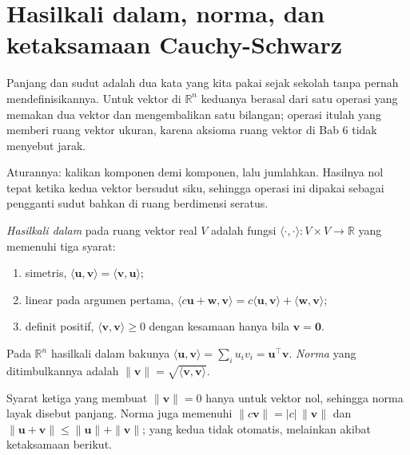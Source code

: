 \section{Hasilkali dalam, norma, dan ketaksamaan Cauchy-Schwarz}

Panjang dan sudut adalah dua kata yang kita pakai sejak sekolah tanpa pernah
mendefinisikannya. Untuk vektor di $\mathbb{R}^{n}$ keduanya berasal dari satu operasi
yang memakan dua vektor dan mengembalikan satu bilangan; operasi itulah yang memberi
ruang vektor ukuran, karena aksioma ruang vektor di Bab 6 tidak menyebut jarak.

Aturannya: kalikan komponen demi komponen, lalu jumlahkan. Hasilnya nol tepat ketika
kedua vektor bersudut siku, sehingga operasi ini dipakai sebagai pengganti sudut bahkan
di ruang berdimensi seratus.


\begin{definisi}
\emph{Hasilkali dalam} pada ruang vektor real $V$ adalah fungsi
$\langle\cdot,\cdot\rangle\colon V\times V\to\mathbb{R}$ yang memenuhi tiga syarat:
\begin{enumerate}
  \item simetris, $\langle\mathbf{u},\mathbf{v}\rangle=\langle\mathbf{v},\mathbf{u}\rangle$;
  \item linear pada argumen pertama,
        $\langle c\mathbf{u}+\mathbf{w},\mathbf{v}\rangle
         =c\langle\mathbf{u},\mathbf{v}\rangle+\langle\mathbf{w},\mathbf{v}\rangle$;
  \item definit positif, $\langle\mathbf{v},\mathbf{v}\rangle\ge0$ dengan kesamaan
        hanya bila $\mathbf{v}=\mathbf{0}$.
\end{enumerate}
Pada $\mathbb{R}^{n}$ hasilkali dalam bakunya
$\langle\mathbf{u},\mathbf{v}\rangle=\sum_{i}u_{i}v_{i}
=\mathbf{u}^{\top}\mathbf{v}$. \emph{Norma} yang ditimbulkannya adalah
$\|\mathbf{v}\|=\sqrt{\langle\mathbf{v},\mathbf{v}\rangle}$.
\end{definisi}

Syarat ketiga yang membuat $\|\mathbf{v}\|=0$ hanya untuk vektor nol, sehingga norma
layak disebut panjang. Norma juga memenuhi $\|c\mathbf{v}\|=|c|\,\|\mathbf{v}\|$ dan
$\|\mathbf{u}+\mathbf{v}\|\le\|\mathbf{u}\|+\|\mathbf{v}\|$; yang kedua tidak otomatis,
melainkan akibat ketaksamaan berikut.

